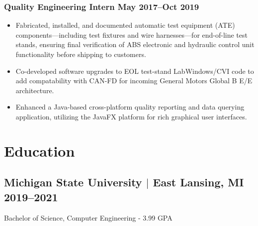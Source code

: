 \documentclass[10pt]{article}
\begin{document}
\subsubsection{Quality Engineering Intern \hfill May 2017--Oct 2019}
\begin{itemize}
  \item Fabricated, installed, and documented automatic test equipment (ATE) 
  components—including test fixtures and wire harnesses—for end-of-line test 
  stands, ensuring final verification of ABS electronic and hydraulic control 
  unit functionality before shipping to customers.
  \item Co-developed software upgrades to EOL test-stand LabWindows/CVI code 
  to add compatability with CAN-FD for incoming General Motors Global B E/E 
  architecture.
  \item Enhanced a Java-based cross-platform quality reporting and data 
  querying application, utilizing the JavaFX platform for rich graphical user 
  interfaces.
\end{itemize}

\section{Education}
\subsection{Michigan State University $|$ {\normalfont East Lansing, MI} \hfill 2019--2021}
\noindent Bachelor of Science, Computer Engineering - 3.99 GPA
\end{document}
